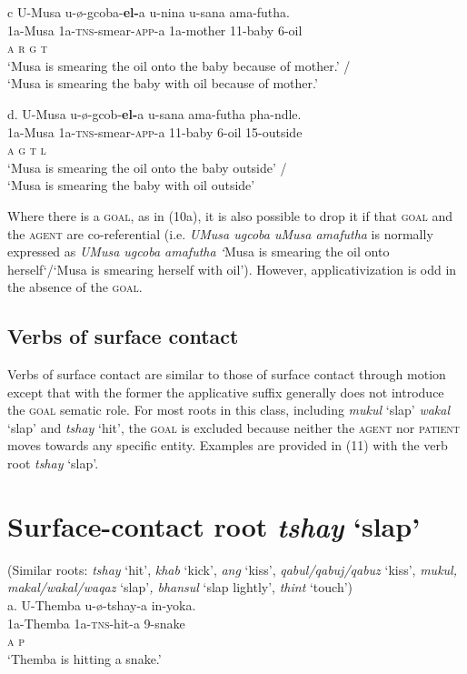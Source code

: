 \documentclass[output=paper]{langsci/langscibook}
\begin{document}
\gll   c  U-Musa    u-ø-gcoba-\textbf{el-}a        u-nina    u-sana      ama-futha. \\
         1a-Musa     1a-\textsc{tns}{}-smear-\textsc{app}{}-a  1a-mother  11-baby   6-oil\\
         \textsc{a                  r        g      t}\\
\glt     ‘Musa is smearing the oil onto the baby because of mother.’ /\\
    ‘Musa is smearing the baby with oil because of mother.’
\z

\gll   d.  U-Musa     u-ø-gcob-\textbf{el-}a              u-sana    ama-futha  pha-ndle. \\
         1a-Musa   1a-\textsc{tns}{}-smear-\textsc{app}{}-a     11-baby  6-oil    15-outside\\
         \textsc{a                  g      t      l}\\
\glt ‘Musa is smearing the oil onto the baby outside’ / \\
‘Musa is smearing the baby with oil outside’ 
\z

Where there is a \textsc{goal,} as in (10a), it is also possible to drop it if that \textsc{goal} and the \textsc{agent} are co-referential (i.e. \textit{UMusa ugcoba uMusa amafutha} is normally expressed as \textit{UMusa ugcoba amafutha ‘}Musa is smearing the oil onto herself‘/‘Musa is smearing herself with oil’). However, applicativization is odd in the absence of the \textsc{goal.}

\section{Verbs of surface contact}

Verbs of surface contact are similar to those of surface contact through motion except that with the former the applicative suffix generally does not introduce the \textsc{goal} sematic role. For most roots in this class, including\textit{ mukul} ‘slap’ \textit{wakal} ‘slap’ and \textit{tshay} ‘hit’, the \textsc{goal} is excluded because neither the \textsc{agent} nor \textsc{patient} moves towards any specific entity. Examples are provided in (11) with the verb root \textit{tshay} ‘slap’.

\chapter[Surface{}-contact root  tshay ‘slap’  ]{Surface-contact root \textit{ tshay }‘slap’  }
     (Similar roots: \textit{tshay} ‘hit’, \textit{khab} ‘kick’, \textit{ang} ‘kiss’, \textit{qabul/qabuj/qabuz} ‘kiss’, \textit{mukul, makal/wakal/waqaz }‘slap’\textit{, bhansul} ‘slap lightly’, \textit{thint} ‘touch’)\\
\gll   a.  U-Themba    u-ø-tshay-a  in-yoka. \\
         1a-Themba  1a-\textsc{tns}{}-hit-a  9-snake\\
          \textsc{a                  p}\\
\glt     ‘Themba is hitting a snake.’
\z
\end{document}
